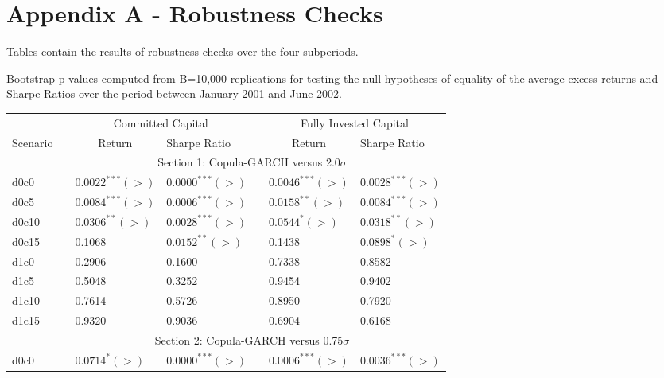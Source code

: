 \documentclass[a4paper,12pt]{report}
\begin{document}
\newpage
\section*{Appendix A - Robustness Checks}

Tables contain the results of robustness checks over the four subperiods. 

\setcounter{table}{0}
\renewcommand{\thetable}{A.\arabic{table}}

\begin{threeparttable}[H]
	\centering \scriptsize
	\caption{Bootstrap p-values computed from B=10,000 replications for testing the null hypotheses of equality of the average excess returns and Sharpe Ratios over the period between January 2001 and June 2002.}
	\begin{tabularx}{\textwidth}{@{\extracolsep{\fill}}lllllll@{}}
		\toprule
		& & \multicolumn{2}{c}{Committed Capital} & \multicolumn{1}{c}{} & \multicolumn{2}{c}{Fully Invested Capital} \\
		\cmidrule{3-4}  \cmidrule{6-7}
		\multicolumn{1}{c}{Scenario} & & \multicolumn{1}{c}{Return} & Sharpe Ratio &       & \multicolumn{1}{c}{Return}& Sharpe Ratio \\
		\midrule
		& \multicolumn{6}{c}{Section 1: Copula-GARCH versus 2.0$\sigma$} \\
		\midrule
		d0c0 & & $0.0022^{***}(>)$ & $0.0000^{***}(>)$ &       & $0.0046^{***}(>)$ & $0.0028^{***}(>)$ \\
		d0c5 & & $0.0084^{***}(>)$ & $0.0006^{***}(>)$ &       & $0.0158^{**}(>)$ & $0.0084^{***}(>)$   \\
		d0c10 & & $0.0306^{**}(>)$ & $0.0028^{***}(>)$ &       & $0.0544^{*}(>)$ & $0.0318^{**}(>)$ \\
		d0c15 & & 0.1068 & $0.0152^{**}(>)$ &       & 0.1438 & $0.0898^{*}(>)$ \\
		d1c0 & & 0.2906 & 0.1600  &       & 0.7338 & 0.8582 \\
		d1c5 & & 0.5048 & 0.3252 &       & 0.9454 & 0.9402 \\
		d1c10 & & 0.7614 & 0.5726 &       & 0.8950 & 0.7920 \\
		d1c15 & & 0.9320 & 0.9036 &       & 0.6904 & 0.6168 \\
		\midrule
		& \multicolumn{6}{c}{Section 2: Copula-GARCH versus 0.75$\sigma$} \\
		\midrule
		d0c0 & & $0.0714^{*}(>)$ & $0.0000^{***}(>)$ &       & $0.0006^{***}(>)$ & $0.0036^{***}(>)$ \\

\end{tabularx}
\end{threeparttable}
\end{document}

